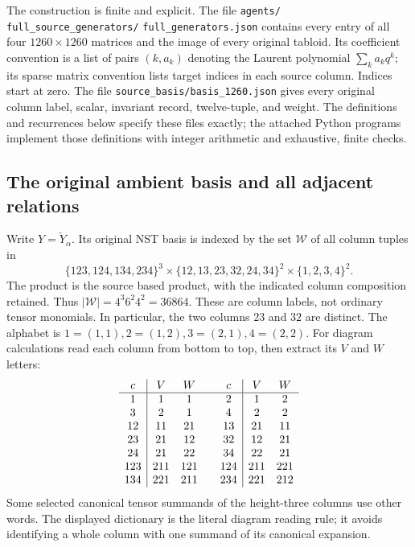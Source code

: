 The construction is finite and explicit.  The file
\texttt{agents/}\allowbreak
\texttt{full\_source\_generators/}\allowbreak
\texttt{full\_generators.json}
contains every entry of all four $1260\times1260$ matrices and
the image of every original tabloid. Its coefficient convention is
a list of pairs $(k,a_k)$ denoting the Laurent polynomial
$\sum_k a_kq^k$; its sparse matrix convention lists target indices
in each source column. Indices start at zero. The file
\texttt{source\_basis/basis\_1260.json} gives every original
column label, scalar, invariant record, twelve-tuple, and weight.
The definitions and recurrences below specify these files exactly;
the attached Python programs implement those definitions with
integer arithmetic and exhaustive, finite checks.

\subsection{The original ambient basis and all adjacent relations}

Write $Y=\check Y_\alpha$. Its original NST basis is indexed by
the set $\mathcal W$ of all column tuples in
\[
 \{123,124,134,234\}^3\times
 \{12,13,23,32,24,34\}^2\times\{1,2,3,4\}^2.
\]
The product is the source based product, with the indicated column
composition retained. Thus $|\mathcal W|=4^3 6^2 4^2=36864$.
These are column labels, not ordinary tensor monomials. In
particular, the two columns $23$ and $32$ are distinct.
The alphabet is $1=(1,1),2=(1,2),3=(2,1),4=(2,2)$.
For diagram calculations read each column from bottom to top,
then extract its $V$ and $W$ letters:
\[
\begin{array}{c|cc@{\qquad}c|cc}
c&V&W&c&V&W\\\hline
1&1&1&2&1&2\\3&2&1&4&2&2\\
12&11&21&13&21&11\\23&21&12&32&12&21\\
24&21&22&34&22&21\\
123&211&121&124&211&221\\
134&221&211&234&221&212
\end{array}
\]
Some selected canonical tensor summands of the height-three
columns use other words. The displayed dictionary is the literal
diagram reading rule; it avoids identifying a whole column with
one summand of its canonical expansion.

